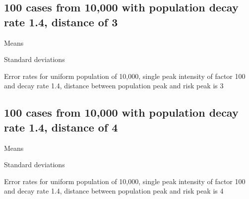 \subsection{100 cases from 10,000 with population decay rate 1.4, distance of 3}
\begin{table}[H]
\centering
\scriptsize

    \begin{subtable}{0.5\textwidth}
    
    \caption{Means} 
    \end{subtable}%
    \begin{subtable}{0.5\textwidth}
    
    \caption{Standard deviations} 
    \end{subtable}

\caption{Error rates for uniform population of 10,000, single peak intensity of factor 100 and decay rate 1.4, distance between population peak and risk peak is 3}
\label{tbl:mean_error_rates:p1.4_100_1_1h_3s}
\end{table}

\subsection{100 cases from 10,000 with population decay rate 1.4, distance of 4}
\begin{table}[H]
\centering
\scriptsize

    \begin{subtable}{0.5\textwidth}
    
    \caption{Means} 
    \end{subtable}%
    \begin{subtable}{0.5\textwidth}
    
    \caption{Standard deviations} 
    \end{subtable}

\caption{Error rates for uniform population of 10,000, single peak intensity of factor 100 and decay rate 1.4, distance between population peak and risk peak is 4}
\label{tbl:mean_error_rates:p1.4_100_1_1h_4s}
\end{table}

